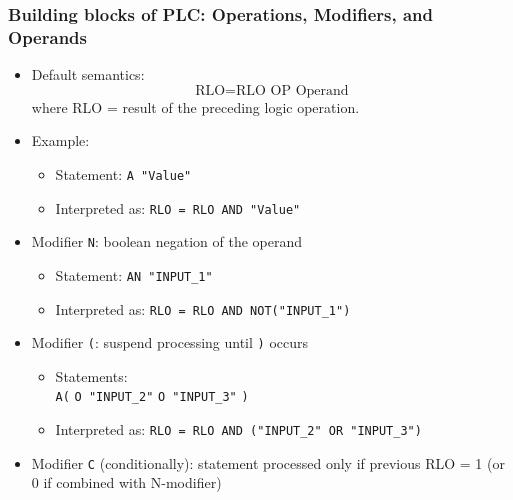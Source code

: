 \begin{frame}
	\frametitle{Building blocks of PLC: Operations, Modifiers, and Operands}
	\footnotesize
	\begin{itemize}
		\item Default semantics: 
		\begin{equation}
		\text{RLO} = \text{RLO OP Operand}
		\end{equation}
		where RLO = result of the preceding logic operation.
		\item Example: 
		\begin{itemize}
			\item Statement: \texttt{A "Value"}  
			\item Interpreted as: \texttt{RLO = RLO AND "Value"}
		\end{itemize}
		\item Modifier \texttt{N}: boolean negation of the operand
		\begin{itemize}
			\item Statement: \texttt{AN "INPUT\_1"}  
			\item Interpreted as: \texttt{RLO = RLO AND NOT("INPUT\_1")}
		\end{itemize}
		\item Modifier \texttt{(}: suspend processing until \texttt{)} occurs
		\begin{itemize}
			\item Statements: \\
			\texttt{A(} \newline
			\texttt{O "INPUT\_2"} \newline
			\texttt{O "INPUT\_3"} \newline
			\texttt{)}
			\item Interpreted as: \texttt{RLO = RLO AND ("INPUT\_2" OR "INPUT\_3")}
		\end{itemize}
		\item Modifier \texttt{C} (conditionally): statement processed only if previous RLO = 1 (or 0 if combined with N-modifier)
	\end{itemize}
\end{frame}


